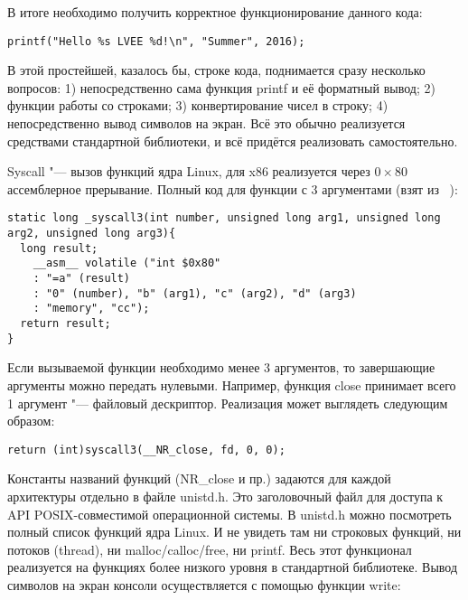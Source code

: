 \documentclass[10pt, a5paper]{article}
\begin{document}
В итоге необходимо получить корректное функционирование \linebreak данного кода:
\lstset{ %
language=C,                 %
basicstyle=\small\sffamily, %
breaklines=true,           %
breakatwhitespace=false, %
}
\begin{lstlisting}
printf("Hello %s LVEE %d!\n", "Summer", 2016);
\end{lstlisting}

В этой простейшей, казалось бы, строке кода, поднимается сразу несколько вопросов: 1) непосредственно сама функция printf и её форматный вывод; 2) функции работы со строками; 3) конвертирование чисел в строку; 4) непосредственно вывод символов на экран. Всё это обычно реализуется средствами стандартной библиотеки, и всё придётся реализовать самостоятельно.

Syscall "--- вызов функций ядра Linux, для x86 реализуется через $0\times80$ ассемблерное прерывание. Полный код для функции с 3 аргументами (взят из ~\cite{Khrabrov4}):

\begin{lstlisting}
static long _syscall3(int number, unsigned long arg1, unsigned long arg2, unsigned long arg3){
  long result;
    __asm__ volatile ("int $0x80"
    : "=a" (result)
    : "0" (number), "b" (arg1), "c" (arg2), "d" (arg3)
    : "memory", "cc");
  return result;
}
\end{lstlisting}

Если вызываемой функции необходимо менее 3 аргументов, то завершающие аргументы можно передать нулевыми. Например, \linebreak функция close принимает всего 1 аргумент "--- файловый дескриптор. Реализация может выглядеть следующим образом:

\begin{lstlisting}
return (int)syscall3(__NR_close, fd, 0, 0);
\end{lstlisting}

Константы названий функций (NR\_close и пр.) задаются для каждой архитектуры отдельно в файле unistd.h. Это заголовочный файл для доступа к API POSIX-совместимой операционной системы. В unistd.h можно посмотреть полный список функций ядра Linux. И не увидеть там ни строковых функций, ни потоков (thread), ни malloc/calloc/free, ни printf. Весь этот функционал реализуется на функциях более низкого уровня в стандартной библиотеке. Вывод символов на экран консоли осуществляется с помощью функции write:
\end{document}
